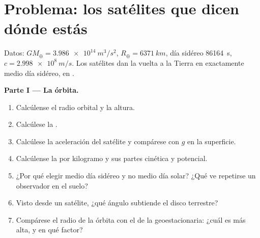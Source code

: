 \section{Problema: los satélites que dicen dónde estás}

\begin{problem}
\label{pb:b1:central-forces:1}
Datos: $GM_\oplus = \qty{3.986e14}{m^3/s^2}$, $R_\oplus = \qty{6371}{km}$,
día sidéreo \qty{86164}{s}, $c = \qty{2.998e8}{m/s}$. Los satélites dan la
vuelta a la Tierra en exactamente medio día sidéreo, en .

\medskip
\noindent\textbf{Parte I --- La órbita.}
\begin{enumerate}
  \item Calcúlense el radio orbital y la altura.
  \item Calcúlese la .
  \item Calcúlese la aceleración del satélite y compárese con $g$ en la
        superficie.
  \item Calcúlense la  por kilogramo y sus partes cinética
        y potencial.
  \item ¿Por qué elegir medio día sidéreo y no medio día solar? ¿Qué ve
        repetirse un observador en el suelo?
  \item Visto desde un satélite, ¿qué ángulo subtiende el disco terrestre?
  \item Compárese el radio de la órbita con el de la geoestacionaria:
        ¿cuál es más alta, y en qué factor?
\end{enumerate}


\end{problem}
